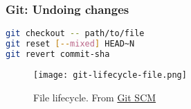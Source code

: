 \begin{frame}[fragile]

\frametitle{Git: Undoing changes}

\begin{lstlisting}[language=Bash]
git checkout -- path/to/file
git reset [--mixed] HEAD~N
git revert commit-sha
\end{lstlisting}


\begin{figure}
\centering
\texttt{[image: git-lifecycle-file.png]}
\caption{File lifecycle. From \href{https://git-scm.com/book/en/v2/Git-Basics-Recording-Changes-to-the-Repository}{Git SCM}}
\end{figure}

\end{frame}